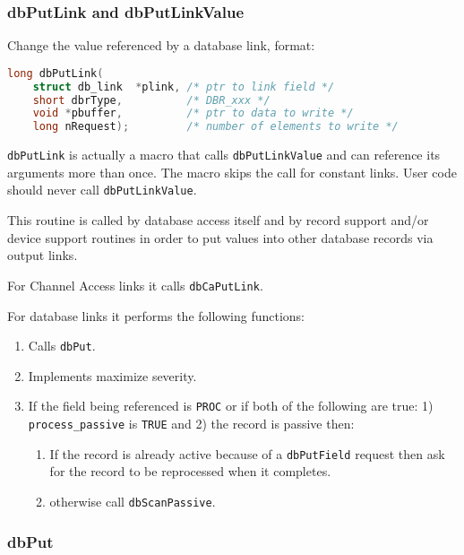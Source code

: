 \subsubsection{dbPutLink and dbPutLinkValue}

Change the value referenced by a database link, format:

\begin{lstlisting}[language=C]
long dbPutLink(
    struct db_link  *plink, /* ptr to link field */
    short dbrType,          /* DBR_xxx */
    void *pbuffer,          /* ptr to data to write */
    long nRequest);         /* number of elements to write */
\end{lstlisting}

\verb|dbPutLink| is actually a macro that calls \verb|dbPutLinkValue| and can reference its arguments more than once.
The macro skips the call for constant links.
User code should never call \verb|dbPutLinkValue|.

This routine is called by database access itself and by record support and/or device support routines in order to put values into other database records via output links.

For Channel Access links it calls \verb|dbCaPutLink|.

For database links it performs the following functions:

\begin{enumerate}

\item Calls \verb|dbPut|.

\item Implements maximize severity.

\item If the field being referenced is \verb|PROC| or if both of the following are true: 1) \verb|process_passive| is \verb|TRUE| and 2) the record is passive then:

\begin{enumerate}

\item If the record is already active because of a \verb|dbPutField| request then ask for the record to be reprocessed when it completes.

\item otherwise call \verb|dbScanPassive|.

\end{enumerate}
\end{enumerate}

\subsubsection{dbPut}

